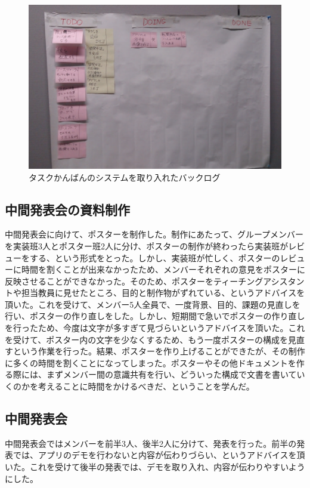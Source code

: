 \documentclass[openany,11pt,papersize]{jsbook}
\begin{document}
\begin{figure}[H]
\begin{center}
\includegraphics[width=14cm, bb=0 0 1206 783]{img/TaskKanban.png}
\end{center}
\caption{タスクかんばんのシステムを取り入れたバックログ}
\end{figure}


\subsection{中間発表会の資料制作}
\par 中間発表会に向けて、ポスターを制作した。制作にあたって、グループメンバーを実装班3人とポスター班2人に分け、ポスターの制作が終わったら実装班がレビューをする、という形式をとった。しかし、実装班が忙しく、ポスターのレビューに時間を割くことが出来なかったため、メンバーそれぞれの意見をポスターに反映させることができなかった。そのため、ポスターをティーチングアシスタントや担当教員に見せたところ、目的と制作物がずれている、というアドバイスを頂いた。これを受けて、メンバー5人全員で、一度背景、目的、課題の見直しを行い、ポスターの作り直しをした。しかし、短期間で急いでポスターの作り直しを行ったため、今度は文字が多すぎて見づらいというアドバイスを頂いた。これを受けて、ポスター内の文字を少なくするため、もう一度ポスターの構成を見直すという作業を行った。結果、ポスターを作り上げることができたが、その制作に多くの時間を割くことになってしまった。ポスターやその他ドキュメントを作る際には、まずメンバー間の意識共有を行い、どういった構成で文書を書いていくのかを考えることに時間をかけるべきだ、ということを学んだ。


\subsection{中間発表会}
\par 中間発表会ではメンバーを前半3人、後半2人に分けて、発表を行った。前半の発表では、アプリのデモを行わないと内容が伝わりづらい、というアドバイスを頂いた。これを受けて後半の発表では、デモを取り入れ、内容が伝わりやすいようにした。
\end{document}
